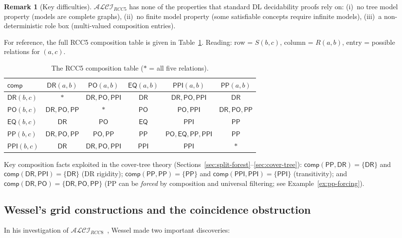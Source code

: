 \documentclass[
]{ceurart}
\theoremstyle{definition}
\newtheorem{remark}[theorem]{Remark}
\newcommand{\ALCIRCC}[1]{\ensuremath{\mathcal{ALCI}_{\mathit{RCC#1}}}}
\newcommand{\DR}{\ensuremath{\mathsf{DR}}}
\newcommand{\PO}{\ensuremath{\mathsf{PO}}}
\newcommand{\EQ}{\ensuremath{\mathsf{EQ}}}
\newcommand{\PP}{\ensuremath{\mathsf{PP}}}
\newcommand{\PPI}{\ensuremath{\mathsf{PPI}}}
\newcommand{\comp}{\ensuremath{\mathsf{comp}}}
\begin{document}
\begin{remark}[Key difficulties]
$\ALCIRCC{5}$ has none of the properties that standard DL
decidability proofs rely on:
(i)~no tree model property (models are complete graphs),
(ii)~no finite model property (some satisfiable concepts require
infinite models),
(iii)~a non-deterministic role box (multi-valued composition entries).
\end{remark}

For reference, the full RCC5 composition table is given in
Table~\ref{tab:comp}.  Reading: row = $S(b,c)$, column = $R(a,b)$,
entry = possible relations for $(a,c)$.

\begin{table}[ht]
\centering
\caption{The RCC5 composition table ($*$ = all five relations).}
\label{tab:comp}
\renewcommand{\arraystretch}{1.15}
\begin{tabular}{l|ccccc}
\toprule
$\comp$ & $\DR(a,b)$ & $\PO(a,b)$ & $\EQ(a,b)$ & $\PPI(a,b)$ & $\PP(a,b)$ \\
\midrule
$\DR(b,c)$ & $*$ & $\DR,\PO,\PPI$ & $\DR$ & $\DR,\PO,\PPI$ & $\DR$ \\
$\PO(b,c)$ & $\DR,\PO,\PP$ & $*$ & $\PO$ & $\PO,\PPI$ & $\DR,\PO,\PP$ \\
$\EQ(b,c)$ & $\DR$ & $\PO$ & $\EQ$ & $\PPI$ & $\PP$ \\
$\PP(b,c)$ & $\DR,\PO,\PP$ & $\PO,\PP$ & $\PP$ & $\PO,\EQ,\PP,\PPI$ & $\PP$ \\
$\PPI(b,c)$ & $\DR$ & $\DR,\PO,\PPI$ & $\PPI$ & $\PPI$ & $*$ \\
\bottomrule
\end{tabular}
\end{table}

\noindent
Key composition facts exploited in the cover-tree theory
(Sections~\ref{sec:split-forest}--\ref{sec:cover-tree}):
$\comp(\PP,\DR) = \{\DR\}$ and $\comp(\DR,\PPI) = \{\DR\}$
(DR rigidity);
$\comp(\PP,\PP) = \{\PP\}$ and $\comp(\PPI,\PPI) = \{\PPI\}$
(transitivity);
and $\comp(\DR,\PO) = \{\DR,\PO,\PP\}$
(PP can be \emph{forced} by composition and universal filtering;
see Example~\ref{ex:pp-forcing}).

\subsection{Wessel's grid constructions and the coincidence obstruction}
\label{sec:wessel-grid}

In his investigation of $\ALCIRCC{8}$~\cite{Wessel2003}, Wessel
made two important discoveries:
\end{document}
